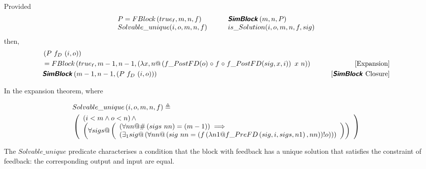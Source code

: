 \begin{theorem}[Expansion]
    Provided 
    \begin{align*}
        \begin{array}[]{ll}
            P = FBlock\left( \logtrue{f}, m, n, f\right) & \qquad \healthy{SimBlock}\left(m, n, P\right) \\
            Solvable\_unique(i, o, m, n, f) & \qquad is\_Solution(i, o, m, n, f, sig) \\
        \end{array}
    \end{align*}
    then,
    \begin{align*} 
       & \left(P~f_D~(i, o)\right) & \\
       & = FBlock\left( \logtrue{f}, m-1, n-1, 
       \left(\lambda x, n @ \left(f\_PostFD(o) \circ f \circ f\_PostFD (sig, x, i)\right)~x~n\right)\right) & \tag*{[Expansion]}\\
      & \healthy{SimBlock}\left(m-1,n-1,\left(P~f_D~(i, o)\right)\right) & \tag*{[\healthy{SimBlock} Closure]}
    \end{align*}
    \label{thm:fd_exp}
\end{theorem}
In the expansion theorem, where 
\begin{definition} \label{def:solvable_unique}
    \begin{align*}
       & Solvable\_unique\left(i, o, m, n, f\right) \defs \\
       & \left(
       \begin{array}[]{l}
          \left(i < m \land o < n\right) \land  \\
            \left(\forall sigs @ \left(
                \begin{array}[]{l}
                    \left(\forall nn @ \#\left(sigs~nn\right) = (m - 1)\right) \implies \\
                    \left(\exists_1 sig@\left(\forall nn @ \left(sig~nn = \left(f \left(\lambda n1@ f\_PreFD\left(sig, i, sigs, n1\right), nn\right)\right)!o\right)\right)\right)
                \end{array} \right)\right)
       \end{array}
       \right)
    \end{align*}
\end{definition}
The $Solvable\_unique$ predicate characterises a condition that the block with feedback has a unique solution that satisfies the constraint of feedback: the corresponding output and input are equal. 


